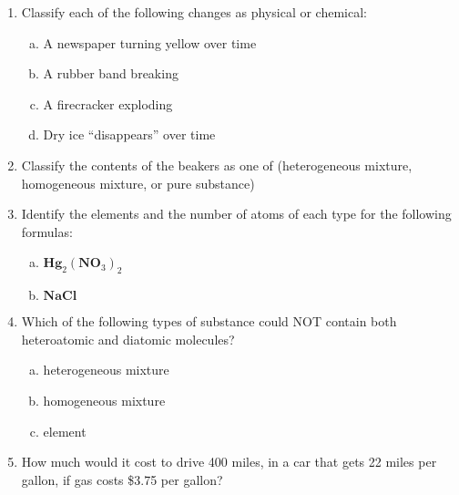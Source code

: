 

\begin{enumerate}
\item Classify each of the following changes as physical or chemical:

\begin{enumerate}[a.]
  \item A newspaper turning yellow over time
  \item A rubber band breaking
  \item A firecracker exploding
  \item Dry ice ``disappears'' over time
\end{enumerate}

\item  Classify the contents of the beakers as one of (heterogeneous mixture, homogeneous mixture, or pure substance)


\item Identify the elements and the number of atoms of each type for
  the following formulas:
\begin{enumerate}[a.]
  \item  $\textbf{Hg}_2(\textbf{NO}_3)_2$
  \item  $\textbf{NaCl}$
\end{enumerate}

\item Which of the following types of substance could NOT contain both heteroatomic and diatomic molecules?
\begin{enumerate}[a.]
  \item  heterogeneous mixture
  \item  homogeneous mixture
  \item  element
\end{enumerate}

\item How much would it cost to drive 400 miles, in a car that gets 22 miles per gallon, if gas costs \$3.75 per gallon?
\end{enumerate}
